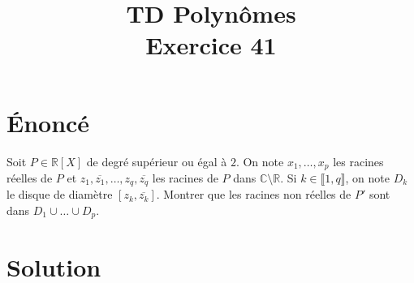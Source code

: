 \documentclass[french]{article}
\title{TD Polynômes \\ Exercice 41}
\date{}
\newcommand{\R}{\mathbb{R}}
\newcommand{\C}{\mathbb{C}}
\begin{document}
\maketitle

\section{Énoncé}
Soit $P\in\R[X]$ de degré supérieur ou égal à $2$. On note $x_1,\ldots,x_p$ les racines réelles de $P$ et $z_1,\overline{z_1},\ldots,z_q,\overline{z_q}$ les racines de $P$ dans $\C\setminus\R$. Si $k\in\llbracket 1,q\rrbracket$, on note $D_k$ le disque de diamètre $[z_k,\overline{z_k}]$. Montrer que les racines non réelles de $P'$ sont dans $D_1\cup\ldots\cup D_p$.
\section{Solution}
\end{document}
